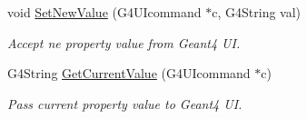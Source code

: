 \begin{DoxyCompactItemize}
void \hyperlink{class_d_d4hep_1_1_simulation_1_1_geant4_u_i_messenger_ad8599a95c5a70bc07dbb6c16e81f5894}{Set\+New\+Value} (G4\+U\+Icommand $\ast$c, G4\+String val)
\begin{DoxyCompactList}\small\item\em Accept ne property value from Geant4 UI. \end{DoxyCompactList}\item 
G4\+String \hyperlink{class_d_d4hep_1_1_simulation_1_1_geant4_u_i_messenger_a931458312c22e41fd3a49ae0a8364293}{Get\+Current\+Value} (G4\+U\+Icommand $\ast$c)
\begin{DoxyCompactList}\small\item\em Pass current property value to Geant4 UI. \end{DoxyCompactList}\end{DoxyCompactItemize}
